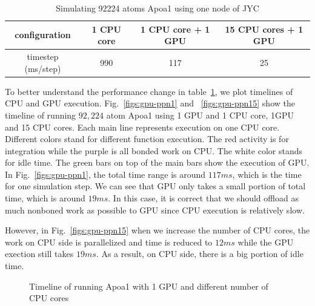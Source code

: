 \begin{table}
\centering
\begin{tabular}{|c|c|c|c|}
\hline
 configuration & 1 CPU core  & 1 CPU core + 1 GPU & 15 CPU cores + 1 GPU \\
\hline
timestep (ms/step) & 990 & 117 & 25 \\
\hline 
\end{tabular}
\caption{Simulating 92224 atoms Apoa1 using one node of JYC }
\label{tab:jac-JYC}
\end{table}


To better understand the performance change in table~\ref{tab:jac-JYC},
we plot timelines of CPU and GPU execution. 
Fig.~\ref{figs:gpu-ppn1} and ~\ref{figs:gpu-ppn15} show the timeline of 
running $92,224$ atom Apoa1 using 1 GPU and 1 CPU core, 1GPU and 15 CPU cores.
Each main line represents execution on one CPU core. Different colors stand for 
different function execution. The red activity is for integration while the purple
is all bonded work on CPU. The white color stands for idle time. The green bars on top of the main bars 
show the execution of GPU. In Fig.~\ref{figs:gpu-ppn1}, the total time range 
is around $117 ms$, which is the time for one simulation step. We can see that
GPU only takes a small portion of total time, which is around $19 ms$.
In this case, it is correct that we should offload as much nonboned work as possible
to GPU since CPU execution is relatively slow. 

However, in Fig.~\ref{figs:gpu-ppn15} when we increase the number of CPU cores, 
the work on CPU side is parallelized and time is reduced to $12 ms $ while the GPU exection
still takes $19 ms$. As a result, on CPU side, there is a big portion of idle time.    

\begin{figure}[h]
\centering
{}
\caption{Timeline of running Apoa1 with 1 GPU and different number of CPU cores}
\label{figs:cpu-gpu}
\end{figure}

